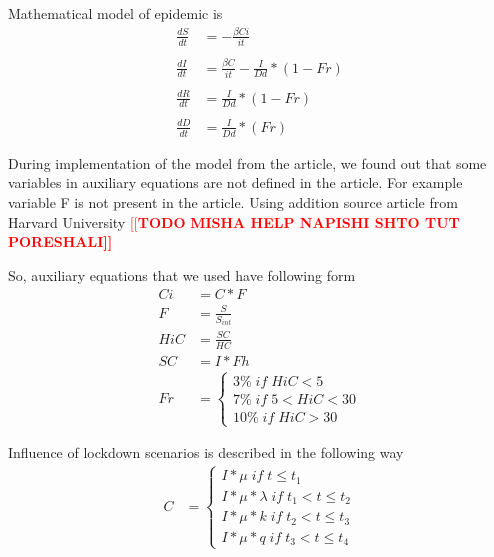 \documentclass[12pt,a4paper,english]{article}
\newcommand{\todo}[1]{\textcolor{red}{[[\textbf{TODO} \textbf{#1]]}}}
\begin{document}
    Mathematical model of epidemic is
    \begin{subequations} \label{eq:quations}
        \begin{align*} 
            \frac{dS}{dt} &= - \frac{\beta Ci}{it}  \\ \\
            \frac{dI}{dt} &= \frac{\beta C}{it} - \frac{I}{Dd} * (1 - Fr)\\ \\
            \frac{dR}{dt} &= \frac{I}{Dd} * (1 - Fr)\\ \\
            \frac{dD}{dt} &= \frac{I}{Dd} * (Fr)
        \end{align*}
    \end{subequations}


    During implementation of the model from the article, we found out that some variables in auxiliary equations are not defined in the article. 
    For example variable F is not present in the article. Using addition source article from Harvard University \cite{Harvard} \todo{MISHA HELP NAPISHI SHTO TUT PORESHALI} 
    
    So, auxiliary equations that we used have following form
    \begin{subequations}
        \begin{align*} 
            Ci  &= C *F \\
            F   &= \frac{S}{S_{int}} \\ 
            HiC &= \frac{SC}{HC} \\
            SC  &= I * Fh \\
            Fr  &=    
            \begin{cases}
                3\% \; if \; HiC < 5 \\
                7\% \; if \; 5 < HiC < 30 \\
                10\% \; if \; HiC > 30
            \end{cases}
        \end{align*}
    \end{subequations}

    Influence of lockdown scenarios is described in the following way
    \begin{subequations}
        \begin{align*} 
            C  &=    
            \begin{cases}
                I * \mu \; if \; t \leq  t_1 \\
                I * \mu * \lambda \; if \; t_1 < t \leq t_2 \\
                I * \mu * k \; if \; t_2 < t \leq t_3 \\
                I * \mu * q \; if \; t_3 < t \leq t_4
            \end{cases}
        \end{align*}
    \end{subequations}
\end{document}
